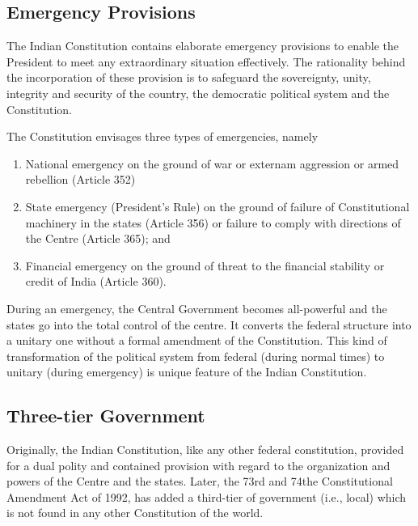 \subsection{Emergency Provisions}

The Indian Constitution contains elaborate emergency provisions to enable the President to meet any extraordinary situation effectively. The rationality behind the incorporation of these provision is to safeguard the sovereignty, unity, integrity and security of the country, the democratic political system and the Constitution.

The Constitution envisages three types of emergencies, namely

\renewcommand{\labelenumi}{\textbf{(\alph{enumi})}}
\begin{enumerate}
  \item National emergency on the ground of war or externam aggression or armed rebellion (Article 352)
  \item State emergency (President's Rule) on the ground of failure of Constitutional machinery in the states (Article 356) or failure to comply with directions of the Centre (Article 365); and
  \item Financial emergency on the ground of threat to the financial stability or credit of India (Article 360).
\end{enumerate}

During an emergency, the Central Government becomes all-powerful and the states go into the total control of the centre. It converts the federal structure into a unitary one without a formal amendment of the Constitution. This kind of transformation of the political system from federal (during normal times) to unitary (during emergency) is unique feature of the Indian Constitution.

\subsection{Three-tier Government}

Originally, the Indian Constitution, like any other federal constitution, provided for a dual polity and contained provision with regard to the organization and powers of the Centre and the states. Later, the 73rd and 74the Constitutional Amendment Act of 1992, has added a third-tier of government (i.e., local) which is not found in any other Constitution of the world.

